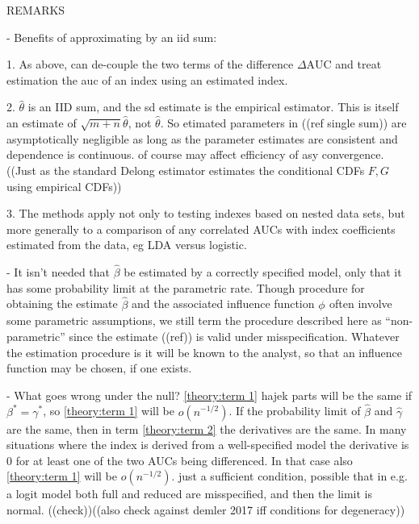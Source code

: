 \documentclass[12pt]{article}
\renewcommand{\star}[1]{{#1}^\ast}
\newcommand{\infl}[1][]{\phi_{#1}}
\newcommand{\F}{F}
\newcommand{\G}{G}
\newcommand{\N}{m+n}
\newcommand{\auc}{\theta}
\newcommand{\aucdiff}{\Delta\text{AUC}}
\theoremstyle{definition}
\begin{document}
REMARKS

- Benefits of approximating by an iid sum:

1. As above, can de-couple the two terms of the difference $\aucdiff$ and treat
estimation the auc of an index using an estimated index.

2.  $\hat\theta$ is an IID sum, and the sd estimate is the empirical
estimator. This is itself an estimate of $\sqrt{\N}\hat\theta$, not
$\hat\theta$. So etimated parameters in ((ref single sum)) are
asymptotically negligible as long as the parameter estimates are
consistent and dependence is continuous. of course may affect
efficiency of asy convergence. %
((Just as the standard Delong estimator estimates the conditional CDFs
$\F,\G$ using empirical CDFs))

3. The methods apply not only to testing indexes based on nested data
sets, but more generally to a comparison of any correlated AUCs with
index coefficients estimated from the data, eg LDA versus logistic.

- It isn't needed that $\hat\beta$ be estimated by a correctly specified
model, only that it has some probability limit at the parametric rate.
Though procedure for obtaining the estimate $\hat\beta$ and the
associated influence function $\infl$ often involve some parametric
assumptions, we still term the procedure described here as
``non-parametric'' since the estimate ((ref)) is valid under
misspecification. Whatever the estimation procedure is it will be
known to the analyst, so that an influence function may be chosen, if
one exists.




- What goes wrong under the null? %
\eqref{theory:term 1} hajek parts will be the same if
$\star\beta=\star\gamma$, so \eqref{theory:term 1} will be
$o(n^{-1/2})$.  If the probability limit of $\hat\beta$ and
$\hat\gamma$ are the same, then in term \eqref{theory:term 2} the
derivatives are the same. In many situations where the index is
derived from a well-specified model the derivative is $0$ for at least
one of the two AUCs being differenced. In that case also
\eqref{theory:term 1} will be $o(n^{-1/2})$. just a sufficient
condition, possible that in e.g. a logit model both full and reduced
are misspecified, and then the limit is normal. ((check))((also check
against demler 2017 iff conditions for degeneracy))
\end{document}
